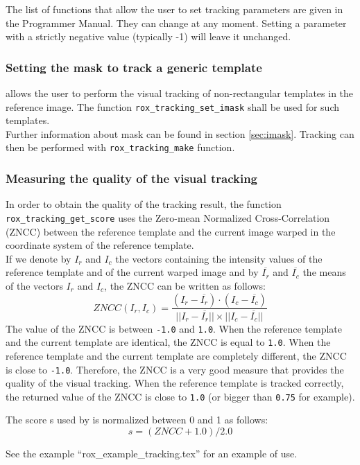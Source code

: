 The list of functions that allow the user to set tracking parameters
are given in the Programmer Manual.  They can change at any
moment. Setting a parameter with a strictly negative value (typically
-1) will leave it unchanged.
\\


\subsubsection{Setting the mask to track a generic template}
\label{sss:track2D_generic_template}

\rox{} allows the user to perform the visual tracking of non-rectangular templates in the reference image. 
The function \lstinline$rox_tracking_set_imask$ shall be used for such templates.\\
Further information about mask can be found in section \ref{sec:imask}. Tracking can then be performed with \lstinline$rox_tracking_make$ function.

\subsubsection{Measuring the quality of the visual tracking}
\label{sss:track2D_measure_quality}

In order to obtain the quality of the tracking result, the function
\lstinline$rox_tracking_get_score$ uses the Zero-mean Normalized
Cross-Correlation (ZNCC) between the reference template and the
current image warped in the coordinate system of the reference
template.\\

If we denote by $I_r$ and $I_c$ the vectors containing the intensity values of the reference template and of the current warped image and
 by $\overline{I_r}$ and $\overline{I_c}$ the means of the vectors $I_r$ and $I_c$, the ZNCC can be written as follows:
\begin{displaymath}
ZNCC(I_r, I_c) = \frac{(I_r - \overline{I_r}) \cdot (I_c - \overline{I_c})}
{||I_r - \overline{I_r}|| \times ||I_c - \overline{I_c}||}
\end{displaymath}
The value of the ZNCC is between {\tt -1.0} and {\tt 1.0}. When the reference template and the current template are identical, the ZNCC is equal to {\tt 1.0}. 
When the reference template and the current template are completely different, the ZNCC is close to {\tt -1.0}.
Therefore, the ZNCC is a very good measure that provides the quality of the visual tracking. 
When the reference template is tracked correctly, the returned value of the ZNCC is close to {\tt 1.0} (or bigger than {\tt 0.75} for example).

The score s used by \rox{} is normalized between 0 and 1 as follows:
\[
s = (ZNCC+1.0)/2.0
\]

See the example ``rox\_example\_tracking.tex'' for an example of use.

%

%
